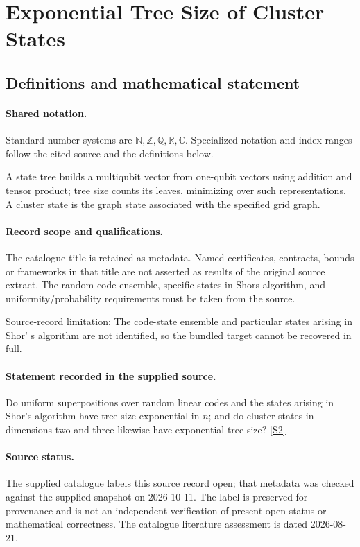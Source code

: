 \documentclass[11pt]{article}
\newcommand{\sref}[2]{\hyperlink{source:#1:#2}{[S#2]}}
\begin{document}
\section{Exponential Tree Size of Cluster States}\label{statement}

\subsection{Definitions and mathematical statement}

\paragraph{Shared notation.}Standard number systems are $\mathbb N,\mathbb Z,\mathbb Q,\mathbb R,\mathbb C$. Specialized notation and index ranges follow the cited source and the definitions below.


A state tree builds a multiqubit vector from one-qubit vectors using addition and tensor product; tree size counts its leaves, minimizing over such representations. A cluster state is the graph state associated with the specified grid graph.
\paragraph{Record scope and qualifications.}
The catalogue title is retained as metadata. Named certificates, contracts, bounds or frameworks in that title are not asserted as results of the original source extract.
The random-code ensemble, specific states in Shor\textquotesingle s algorithm, and uniformity/probability requirements must be taken from the source.

Source-record limitation: The code-state ensemble and particular states arising in Shor' s algorithm are not identified, so the bundled target cannot be recovered in full.
\paragraph{Statement recorded in the supplied source.}
Do uniform superpositions over random linear codes and the states arising in Shor's algorithm have tree size exponential in $n$; and do cluster states in dimensions two and three likewise have exponential tree size? \sref{statement}{2}
\paragraph{Source status.}
The supplied catalogue labels this source record open; that metadata was checked against the supplied snapshot on 2026-10-11. The label is preserved for provenance and is not an independent verification of present open status or mathematical correctness. The catalogue literature assessment is dated 2026-08-21.
\end{document}
